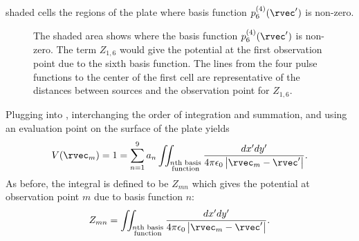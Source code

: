 shaded cells the regions of the plate where basis function
$p_6^{(4)}(\rvec')$ is non-zero.
\begin{figure}
  \begin{center}
  \end{center} \caption{The shaded area shows where the basis
    function $p_6^{(4)}(\rvec')$ is non-zero.  The term $Z_{1,6}$ would
    give the potential at the first observation point due to the sixth
    basis function.  The lines from the four pulse functions to the
    center of the first cell are representative of the distances
    between sources and the observation point for $Z_{1,6}$.
  }  \label{fig:pFourSix}
\end{figure}

Plugging  into ,
interchanging the order of integration and summation, and using an
evaluation point on the surface of the plate yields
\begin{equation}
V(\rvec_m) = 
1 = 
\sum_{n=1}^9 a_n 
  \iint_{\substack{\text{$n$th basis}\\\text{function}}}
  \frac{dx'dy'}{4\pi\epsilon_0
                \left|\rvec_m-\rvec'\right|}.
  \label{eq:vPlateBasisFour}
\end{equation}
As before, the integral is defined to be $Z_{mn}$ which gives the
potential at observation point $m$ due to basis function $n$:
\begin{equation}
  Z_{mn} = 
  \iint_{\substack{\text{$n$th basis}\\\text{function}}}
  \frac{dx'dy'}{4\pi\epsilon_0
                \left|\rvec_m-\rvec'\right|}.
\end{equation}

